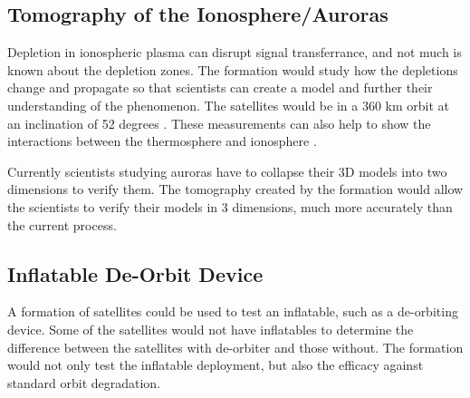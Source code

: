 \subsection{Tomography of the Ionosphere/Auroras}
\label{tomography}

Depletion in ionospheric plasma can disrupt signal transferrance,
and not much is known about the depletion zones. The formation would
study how the depletions change and propagate so that scientists can
create a model and further their understanding of the phenomenon.
The satellites would be in a 360 km orbit at an inclination of 52
degrees \cite{Ref:Krause}\cite{Ref:Bracikowski}. These measurements
can also help to show the interactions between the thermosphere and
ionosphere \cite{Ref:Blalthazor}. 

Currently scientists studying auroras have to collapse their 3D models
into two dimensions to verify them. The tomography created by the
formation would allow the scientists to verify their models in 3 dimensions,
much more accurately than the current process. 


\subsection{Inflatable De-Orbit Device}
\label{inflatable}

A formation of satellites could be used to test an inflatable, such
as a de-orbiting device. Some of the satellites would not have inflatables
to determine the difference between the satellites with de-orbiter
and those without. The formation would not only test the inflatable
deployment, but also the efficacy against standard orbit degradation. 

